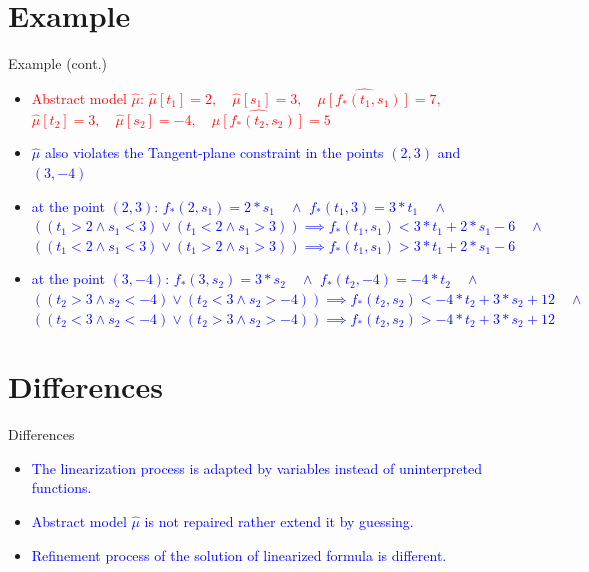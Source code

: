 \documentclass[]{beamer}
\begin{document}
\section{Example}
\begin{frame}{Example (cont.)}
    \begin{itemize}
        \item \textcolor{red}{Abstract model $\hat{\mu}$:  $\hat{\mu}[t_{1}] = 2, \quad \hat{\mu}[s_{1}] = 3, \quad \hat{\mu[f_{\ast}(t_{1}, s_{1})]} = 7,$ $\hat{\mu}[t_{2}] = 3, \quad \hat{\mu}[s_{2}] = -4, \quad \hat{\mu[f_{\ast}(t_{2}, s_{2})]} = 5$}
        \item \textcolor<1>{blue}{$\hat{\mu}$ also violates the Tangent-plane constraint in the points $(2, 3)$ and $(3, -4)$}
        \item \textcolor<2>{blue}{at the point $(2, 3)$: 
    $f_{\ast}(2, s_{1}) = 2 \ast s_{1} \quad \wedge$ \quad
    $f_{\ast}(t_{1}, 3) = 3 \ast t_{1} \quad \wedge$
    $((t_{1} > 2 \wedge s_{1} < 3) \vee (t_{1} < 2 \wedge s_{1} > 3)) \implies f_{\ast}(t_{1}, s_{1}) < 3 \ast t_{1} + 2 \ast s_{1} - 6 \quad \wedge$
     $((t_{1} < 2 \wedge s_{1} < 3) \vee (t_{1} > 2 \wedge s_{1} > 3)) \implies f_{\ast}(t_{1}, s_{1}) > 3 \ast t_{1} + 2 \ast s_{1} - 6$}
		\item \textcolor<3>{blue}{at the point $(3, -4)$: 
    $f_{\ast}(3, s_{2}) = 3 \ast s_{2} \quad \wedge$ \quad
    $f_{\ast}(t_{2}, -4) = -4 \ast t_{2} \quad \wedge$
    $((t_{2} > 3 \wedge s_{2} < -4) \vee (t_{2} < 3 \wedge s_{2} > -4)) \implies f_{\ast}(t_{2}, s_{2}) < -4 \ast t_{2} + 3 \ast s_{2} + 12 \quad \wedge$
     $((t_{2} < 3 \wedge s_{2} < -4) \vee (t_{2} > 3 \wedge s_{2} > -4)) \implies f_{\ast}(t_{2}, s_{2}) > -4 \ast t_{2} + 3 \ast s_{2} + 12$}
    \end{itemize}
\end{frame}

\section{Differences}
\begin{frame}{Differences}
    \begin{itemize}
        \item \textcolor<1>{blue}{The linearization process is adapted by variables instead of uninterpreted functions.}
        \item \textcolor<2>{blue}{Abstract model $\hat{\mu}$ is not repaired rather extend it by guessing.}
		\item \textcolor<3>{blue}{Refinement process of the solution of linearized formula is different.}
    \end{itemize}
\end{frame}
\end{document}
